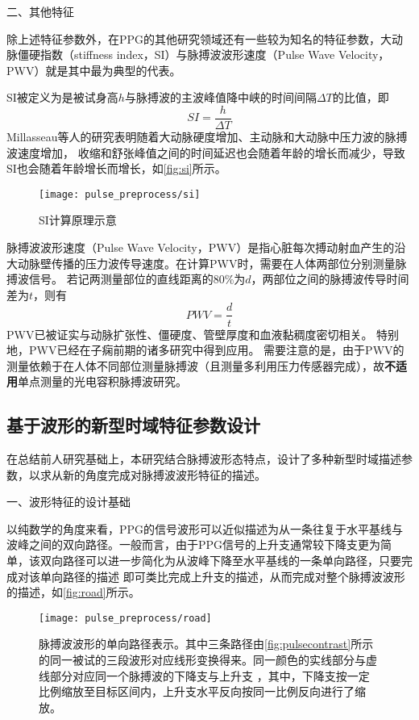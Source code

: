 二、其他特征

除上述特征参数外，在PPG的其他研究领域还有一些较为知名的特征参数，大动脉僵硬指数（stiffness index，SI）与脉搏波波形速度（Pulse Wave Velocity，PWV）就是其中最为典型的代表。

SI被定义为是被试身高$h$与脉搏波的主波峰值降中峡的时间间隔$\Delta T$的比值\cite{Elgendi2012,Millasseau2002,Brumfield2005}，即
\begin{equation}
    \label{equ:si}
    SI = \frac{h}{\Delta T}
\end{equation}
Millasseau等人的研究表明随着大动脉硬度增加、主动脉和大动脉中压力波的脉搏波速度增加，
收缩和舒张峰值之间的时间延迟也会随着年龄的增长而减少，导致SI也会随着年龄增长而增长，如\autoref{fig:si}所示\cite{Elgendi2012,Millasseau2002,Brumfield2005}。
\begin{figure}[htbp]
    \centering
    \texttt{[image: pulse\_preprocess/si]}
    \caption[SI计算原理示意]{\label{fig:si}SI计算原理示意\cite{Elgendi2012,Millasseau2002,Brumfield2005}}
\end{figure}

脉搏波波形速度（Pulse Wave Velocity，PWV）是指心脏每次搏动射血产生的沿大动脉壁传播的压力波传导速度\cite{Van2012}。在计算PWV时，需要在人体两部位分别测量脉搏波信号。
若记两测量部位的直线距离的80\%为$d$，两部位之间的脉搏波传导时间差为$t$，则有
\begin{equation}
    \label{equ:pwv}
    PWV = \frac{d}{t}
\end{equation}
PWV已被证实与动脉扩张性、僵硬度、管壁厚度和血液黏稠度密切相关。
特别地，PWV已经在子痫前期的诸多研究中得到应用\cite{Tomsin2012,Katsipi2014,VivianaIvan2018,Ira2014}。
需要注意的是，由于PWV的测量依赖于在人体不同部位测量脉搏波（且测量多利用压力传感器完成），故\textbf{不适用}单点测量的光电容积脉搏波研究。

\subsection{基于波形的新型时域特征参数设计}
在总结前人研究基础上，本研究结合脉搏波形态特点，设计了多种新型时域描述参数，以求从新的角度完成对脉搏波波形特征的描述。

一、波形特征的设计基础

以纯数学的角度来看，PPG的信号波形可以近似描述为从一条往复于水平基线与波峰之间的双向路径。一般而言，由于PPG信号的上升支通常较下降支更为简单，该双向路径可以进一步简化为从波峰下降至水平基线的一条单向路径，只要完成对该单向路径的描述
即可类比完成上升支的描述，从而完成对整个脉搏波波形的描述，如\autoref{fig:road}所示。
\begin{figure}[htbp]
    \centering
    \texttt{[image: pulse\_preprocess/road]}
    \caption[脉搏波波形的单向路径表示]{\label{fig:road}脉搏波波形的单向路径表示。其中三条路径由\autoref{fig:pulsecontrast}所示的同一被试的三段波形对应线形变换得来。同一颜色的实线部分与虚线部分对应同一个脉搏波的下降支与上升支
    ，其中，下降支按一定比例缩放至目标区间内，上升支水平反向按同一比例反向进行了缩放。}
\end{figure}

